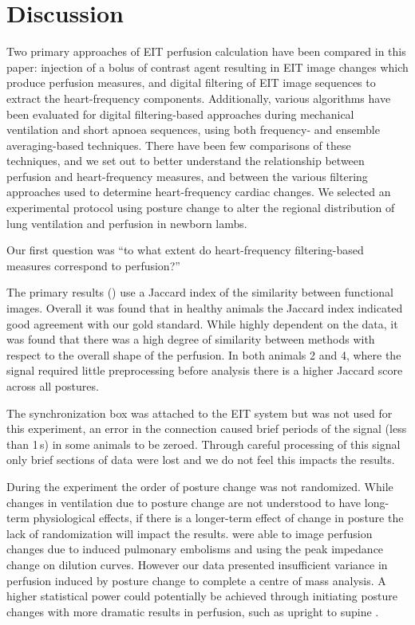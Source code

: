 \section{Discussion}                             %

Two primary approaches of EIT perfusion calculation
have been compared in this paper: injection
of a bolus of contrast agent resulting 
in EIT image changes which produce perfusion measures, and
digital filtering of EIT image sequences to extract
the heart-frequency components.
Additionally, various algorithms have been evaluated
for digital filtering-based approaches during mechanical 
ventilation and short apnoea sequences, 
using both frequency- and ensemble averaging-based techniques.
There have been few comparisons of
these techniques, and 
we set out to better understand the relationship between
perfusion and heart-frequency measures, and between the various filtering
approaches used to determine heart-frequency cardiac changes.
We selected an experimental protocol using posture change 
to alter the regional distribution of lung ventilation
and perfusion in newborn lambs.

Our first question was
``to what extent do heart-frequency filtering-based measures correspond to perfusion?''

The primary results () use a Jaccard index of the similarity
between functional images. Overall it was found that in healthy animals 
the Jaccard index indicated good agreement with our gold standard. While highly
dependent on the data, it was found that there was a high degree of similarity 
between methods with respect to
the overall shape of the perfusion. 
In both animals 2 and 4, where the signal required little preprocessing before analysis 
there is a higher Jaccard score across all postures.

The synchronization box was attached to the EIT system but was not used for this experiment,
an error in the connection caused brief periods of the signal (less than 1\,s) in some animals to be zeroed.
Through careful processing of this signal only brief sections of data were lost and we do not feel this
impacts the results.

During the experiment the order of posture change was not randomized. 
While changes in ventilation due to posture change
are not understood to have long-term physiological effects, if there is a longer-term
effect of change in posture the lack of randomization will impact the 
results.  were able to image perfusion changes due to induced 
pulmonary embolisms and using the peak impedance change on dilution curves.
However our data presented insufficient variance in perfusion induced by posture change to 
complete a centre of mass analysis. A higher statistical power 
could potentially be achieved through initiating posture changes
with more dramatic results in perfusion, such as upright to supine \parencite{nakazato_quantitative_2010}.

